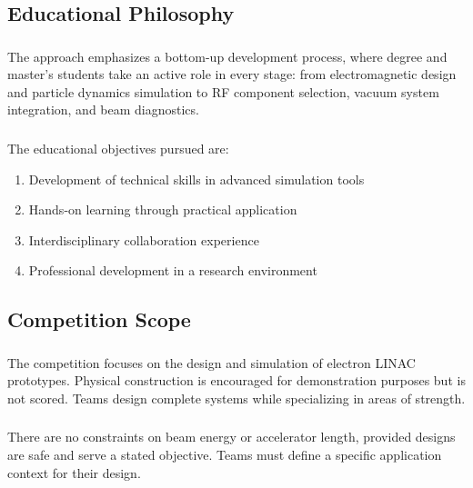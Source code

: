\subsection{Educational Philosophy}

\subsubsection{}
The approach emphasizes a bottom-up development process, where degree and master's students take an active role in every stage: from electromagnetic design and particle dynamics simulation to RF component selection, vacuum system integration, and beam diagnostics.

\subsubsection{}
The educational objectives pursued are:
\begin{enumerate}[noitemsep]
    \item Development of technical skills in advanced simulation tools
    \item Hands-on learning through practical application
    \item Interdisciplinary collaboration experience
    \item Professional development in a research environment
\end{enumerate}

\subsection{Competition Scope}

\subsubsection{}
The competition focuses on the design and simulation of electron LINAC prototypes. Physical construction is encouraged for demonstration purposes but is not scored. Teams design complete systems while specializing in areas of strength.

\subsubsection{}
There are no constraints on beam energy or accelerator length, provided designs are safe and serve a stated objective. Teams must define a specific application context for their design.